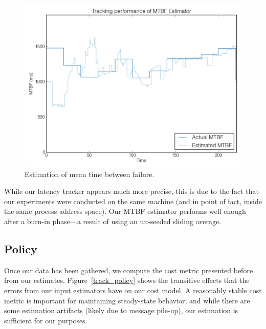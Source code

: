\begin{figure}[htbp]
\begin{center}
\includegraphics[width=\columnwidth]{track_mtbf_final}
\caption{Estimation of mean time between failure.}
\label{track_mtbf}
\end{center}
\end{figure}

While our latency tracker appears much more precise, this is due to the fact that our experiments were conducted on the same machine (and in point of fact, inside the same process address space).
Our MTBF estimator performs well enough after a burn-in phase---a result of using an un-seeded sliding average.

\subsection{Policy}
Once our data has been gathered, we compute the cost metric presented before from our estimates.
Figure~\ref{track_policy} shows the transitive effects that the errors from our input estimators have on our cost model.
A reasonably stable cost metric is important for maintaining steady-state behavior, and while there are some estimation artifacts (likely due to message pile-up), our estimation is sufficient for our purposes.

